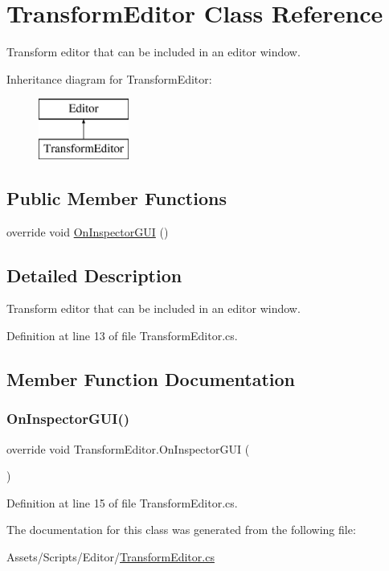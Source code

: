 \hypertarget{class_transform_editor}{}\section{Transform\+Editor Class Reference}
\label{class_transform_editor}


Transform editor that can be included in an editor window.  


Inheritance diagram for Transform\+Editor\+:\begin{figure}[H]
\begin{center}
\leavevmode
\includegraphics[height=2.000000cm]{class_transform_editor}
\end{center}
\end{figure}
\subsection*{Public Member Functions}
\begin{DoxyCompactItemize}
\item 
override void \mbox{\hyperlink{class_transform_editor_ae6e0fcaf3fef317eb960d3542fa45af3}{On\+Inspector\+G\+UI}} ()
\end{DoxyCompactItemize}


\subsection{Detailed Description}
Transform editor that can be included in an editor window. 



Definition at line 13 of file Transform\+Editor.\+cs.



\subsection{Member Function Documentation}
\mbox{\label{class_transform_editor_ae6e0fcaf3fef317eb960d3542fa45af3}} 
\subsubsection{\texorpdfstring{On\+Inspector\+G\+U\+I()}{OnInspectorGUI()}}
{\footnotesize\ttfamily override void Transform\+Editor.\+On\+Inspector\+G\+UI (\begin{DoxyParamCaption}{ }\end{DoxyParamCaption})}



Definition at line 15 of file Transform\+Editor.\+cs.



The documentation for this class was generated from the following file\+:\begin{DoxyCompactItemize}
\item 
Assets/\+Scripts/\+Editor/\mbox{\hyperlink{_transform_editor_8cs}{Transform\+Editor.\+cs}}\end{DoxyCompactItemize}
